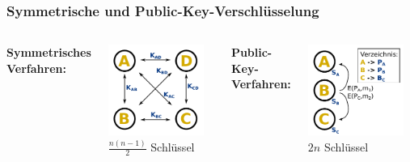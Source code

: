 \documentclass{beamer}
\begin{document}
\begin{frame}
\frametitle{Symmetrische und Public-Key-Verschlüsselung}
\begin{columns}

	\textbf{Symmetrisches Verfahren:}
	
	\includegraphics[width=0.9\textwidth]{images/symmetric.pdf}\\

	\(\frac{n(n-1)}{2}\) Schlüssel

\pause
{}
	\textbf{Public-Key-Verfahren:}

	\includegraphics[width=0.9\textwidth]{images/asymmetric2.pdf}\\

	\(2n\) Schlüssel

\end{columns}
\end{frame}
\end{document}
